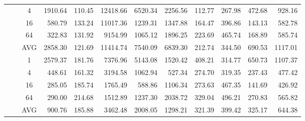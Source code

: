 \begin{table*}[]
\begin{center}
\begin{tabular}{|c|c|c|N{5}{1}N{5}{1}N{5}{1}N{5}{1}N{5}{1}N{5}{1}n{5}{1}n{5}{1}|n{5}{1}|}
 & & 4                                                 & 1910.64 & 110.45 & 12418.66 &  6520.34 &  2256.56 & 112.77 & 267.98 &  472.68 &  928.16  \\
 & & 16                                                &  580.79 & 133.24 & 11017.36 &  1239.31 &  1347.88 & 164.47 & 396.86 &  143.13 &  582.78  \\
 & & 64                                                &  322.83 & 131.92 &  9154.99 &  1065.12 &  1896.25 & 223.69 & 465.74 &  168.89 &  585.74  \\  
 & & AVG                                               & 2858.30 & 121.69 & 11414.74 &  7540.09 &  6839.30 & 212.74 & 344.50 &  690.53 & {\boldmath}1117.01  \\  
 &  & 1 & 2579.37 & 181.76 &  7376.96 &  5143.08 &  1520.42 & 408.21 & 314.77 &  650.73 & 1107.37 \\
 & & 4                            &  448.61 & 161.32 &  3194.58 &  1062.94 &   527.34 & 274.70 & 319.35 &  237.43 &  477.42 \\
 & & 16                           &  285.05 & 185.74 &  1765.49 &   588.86 &  1106.34 & 273.63 & 467.35 &  141.69 &  426.92 \\
 & & 64                           &  290.00 & 214.68 &  1512.89 &  1237.30 &  2038.72 & 329.04 & 496.21 &  270.83 &  565.82 \\ 
 & & AVG                          &  900.76 & 185.88 &  3462.48 &  2008.05 &  1298.21 & 321.39 & 399.42 &  325.17 &  {\boldmath}644.38 \\  \hline
\end{tabular}
\npnoround
\end{center}
\end{table*}

\fi

